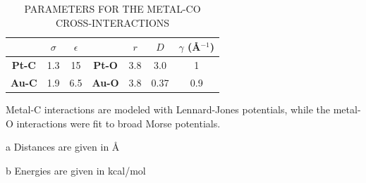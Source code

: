 \begin{table}[H]
  \caption{PARAMETERS FOR THE METAL-CO CROSS-INTERACTIONS}
\centering
\begin{threeparttable}
\begin{tabular}{  c   cc   c  ccc }
\hline \hline
 &  $\sigma$\tnote{a} & $\epsilon$\tnote{b} & & $r$\tnote{a} & $D$\tnote{b} & $\gamma$ (\AA$^{-1}$) \\
\hline
\textbf{Pt-C} & 1.3 & 15  & \textbf{Pt-O} & 3.8 & 3.0 & 1 \\
\textbf{Au-C} & 1.9 & 6.5  & \textbf{Au-O} & 3.8 & 0.37 & 0.9\\
\hline \hline
\end{tabular}
\begin{tablenotes}
  \item Metal-C interactions are modeled with Lennard-Jones potentials, while the metal-O interactions were fit to broad Morse potentials.
  \item[a] Distances are given in \AA
  \item[b] Energies are given in kcal/mol
\end{tablenotes}
\end{threeparttable}
\label{tab:co_parameters}
\end{table}

